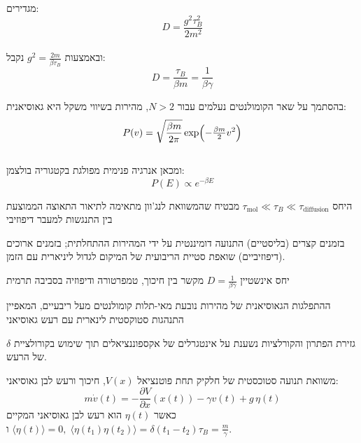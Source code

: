 \documentclass{tstextbook}
\begin{document}
\begin{definition}
מגדירים:\\
$$D = \frac{g^{2}\tau_{B}^{2}}{2m^{2}}$$\\

ובאמצעות \(g^{2} = \tfrac{2m}{\beta \tau_{B}}\) נקבל:\\
$$D = \frac{\tau_{B}}{\beta m} = \frac{1}{\beta \gamma}$$

\end{definition}
\begin{proposition}
בהסתמך על שאר הקומולנטים נעלמים עבור \(N>2\), מהירות בשיווי משקל היא גאוסיאנית:\\
$$P(v) = \sqrt{\frac{\beta m}{2\pi}} \exp\Bigl(-\tfrac{\beta m}{2} v^{2}\Bigr)$$\\

ומכאן אנרגיה פנימית מפולגת בקטגוריה בולצמן:\\
$$P(E) \propto e^{-\beta E}$$

\end{proposition}
\begin{remark}
היחס \(\tau_{\text{mol}} \ll \tau_{B} \ll \tau_{\text{diffusion}}\) מבטיח שהמשוואת לנג'וון מתאימה לתיאור התאוצה הממוצעת בין התנגשות למעבר דיפוזיבי  

\end{remark}
\begin{remark}
בזמנים קצרים (בליסטיים) התנועה דומיננטית על ידי המהירות ההתחלתית; בזמנים ארוכים (דיפוזיביים) שואפת סטיית הריבועית של המיקום לגדול ליניארית עם הזמן.

\end{remark}
\begin{remark}
יחס אינשטיין \(D = \tfrac{1}{\beta \gamma}\) מקשר בין חיכוך, טמפרטורה ודיפוזיה בסביבה תרמית  

\end{remark}
\begin{remark}
ההתפלגות הגאוסיאנית של מהירות נובעת מאי-תלות קומולנטים מעל ריבעיים, המאפיין התנהגות סטוקסטית לינארית עם רעש גאוסיאני  

\end{remark}
\begin{remark}
גזירת הפתרון והקורלציות נשענת על אינטגרלים של אקספוננציאלים תוך שימוש בקורולציית \(\delta\) של הרעש.

\end{remark}
\begin{proposition}
משוואת תנועה סטוכסטית של חלקיק תחת פוטנציאל \(V(x)\), חיכוך ורעש לבן גאוסיאני:
$$m\dot v(t) = -\frac{\partial V}{\partial x}(x(t)) - \gamma v(t) + g\,\eta(t)
$$
כאשר \(\eta(t)\) הוא רעש לבן גאוסיאני המקיים \(\langle \eta(t)\rangle=0,\;\langle \eta(t_1)\eta(t_2)\rangle=\delta(t_1-t_2)\) ו\(\tau_B = \tfrac{m}{\gamma}\).

\end{proposition}
\end{document}
